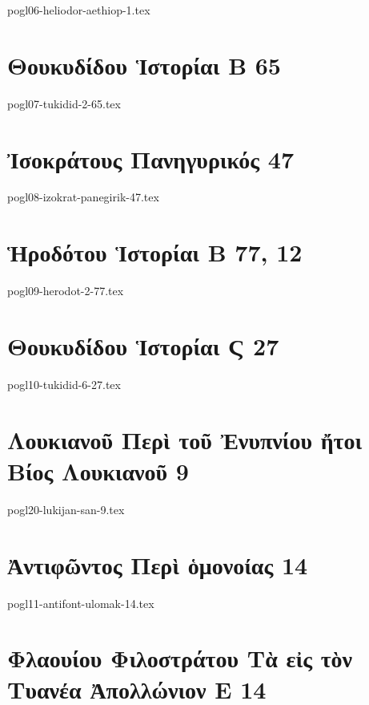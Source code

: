 \documentclass[a4paper,12pt,twoside]{report}
\begin{document}
{pogl06-heliodor-aethiop-1.tex}

\chapter[Θουκυδίδου Ἱστορίαι Β]{\textgreek[variant=ancient]{Θουκυδίδου Ἱστορίαι Β} 65}

{pogl07-tukidid-2-65.tex}

\chapter[Ἰσοκράτους Πανηγυρικός ]{\textgreek[variant=ancient]{Ἰσοκράτους Πανηγυρικός} 47}

{pogl08-izokrat-panegirik-47.tex}

\chapter[Ἡροδότου Ἱστορίαι Β]{\textgreek[variant=ancient]{Ἡροδότου Ἱστορίαι Β} 77, 12}

{pogl09-herodot-2-77.tex}

\chapter[Θουκυδίδου Ἱστορίαι Ϛ 27]{\textgreek[variant=ancient]{Θουκυδίδου Ἱστορίαι Ϛ} 27}

{pogl10-tukidid-6-27.tex}

\chapter[Λουκιανοῦ Περὶ τοῦ Ἐνυπνίου]{\textgreek[variant=ancient]{Λουκιανοῦ Περὶ τοῦ Ἐνυπνίου ἤτοι Βίος Λουκιανοῦ} 9}

{pogl20-lukijan-san-9.tex}

\chapter[Ἀντιφῶντος Περὶ ὁμονοίας]{\textgreek[variant=ancient]{Ἀντιφῶντος Περὶ ὁμονοίας} 14}

{pogl11-antifont-ulomak-14.tex}

\chapter[Φιλοστράτου Tὰ εἰς τὸν Τυανέα Ἀπολλώνιον Ε]{\textgreek[variant=ancient]{Φλαουίου Φιλοστράτου Tὰ εἰς τὸν Τυανέα Ἀπολλώνιον Ε} 14}
\end{document}
